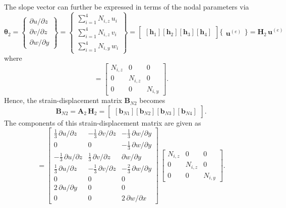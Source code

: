 The slope vector can further be expressed in terms of the nodal parameters via
\small
\begin{equation}
\boldsymbol{\theta}_2 =  \begin{Bmatrix}
\partial u / \partial z\\
\partial v / \partial z \\
\partial w / \partial y
\end{Bmatrix}
= \begin{Bmatrix}
\sum\nolimits_{i=1}^4 N_{i,z} \, u_i\\
\sum\nolimits_{i=1}^4 N_{i,z} \, v_i \\
\sum\nolimits_{i=1}^4 N_{i,y} \, w_i
\end{Bmatrix} 
= \begin{bmatrix}
[\mathbf{h}_1] [\mathbf{h}_2] [\mathbf{h}_3] [\mathbf{h}_4] 
\end{bmatrix} \bigl\{ \begin{matrix} \mathbf{u}^{(e)} \end{matrix} \bigr\}
= \mathbf{H}_2 \, \mathbf{u}^{(e)} 
\end{equation}
\normalsize
where 
\begin{equation}
[\mathbf{h}_i] = \begin{bmatrix}
N_{i,z} &  0 & 0  \\
0 & N_{i,z} & 0  \\
0 & 0 & N_{i,y} \end{bmatrix} .
\end{equation}
Hence, the strain-displacement matrix $\mathbf{B}_{N2}$ becomes
\begin{equation}
\mathbf{B}_{N2} = \mathbf{A}_2 \, \mathbf{H}_2 = \begin{bmatrix}
[\mathbf{b}_{N1}] [\mathbf{b}_{N2}] [\mathbf{b}_{N3}] [\mathbf{b}_{N4}]
\end{bmatrix}. 
\end{equation}
The components of this strain-displacement matrix are given as
\begin{equation}
[\mathbf{b}_{Ni}] =  \begin{bmatrix}
	\tfrac{1}{3} \, \partial u / \partial z &  - \tfrac{1}{3} \, \partial v / \partial z & - \tfrac{1}{3} \, \partial w / \partial y  \\
	0 & 0 & - \tfrac{1}{3} \, \partial w / \partial y  \\
	-\tfrac{1}{3} \, \partial u / \partial z  & \tfrac{1}{3} \, \partial v / \partial z & \partial w / \partial y \\
	\tfrac{1}{3} \, \partial u / \partial z & - \tfrac{1}{3} \, \partial v / \partial z & - \tfrac{2}{3} \, \partial w / \partial y   \\
	0 & 0 & 0  \\
	2 \, \partial u / \partial y &  0 & 0 \\
	0 &  0 &  2 \, \partial w / \partial x  \end{bmatrix} \, \begin{bmatrix}
N_{i,z} &  0 & 0  \\
0 & N_{i,z} & 0  \\
0 & 0 & N_{i,y}  \end{bmatrix}. 
\end{equation}

